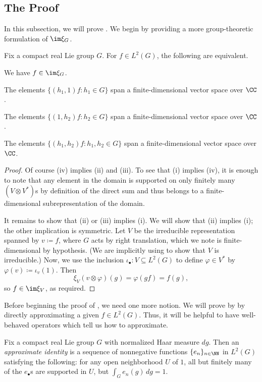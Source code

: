 \documentclass{amsart}
\begin{document}
\subsection{The Proof}
In this subsection, we will prove . We begin by providing a more group-theoretic formulation of $\im\xi_G$.
\begin{lemma} \label{lem:better-im-xi}
	Fix a compact real Lie group $G$. For $f\in L^2(G)$, the following are equivalent.
	\begin{listroman}
		\item We have $f\in\im\xi_G$.
		\item The elements $\{(h_1,1)f:h_1\in G\}$ span a finite-dimensional vector space over $\CC$.
		\item The elements $\{(1,h_2)f:h_2\in G\}$ span a finite-dimensional vector space over $\CC$.
		\item The elements $\{(h_1,h_2)f:h_1,h_2\in G\}$ span a finite-dimensional vector space over $\CC$.
	\end{listroman}
\end{lemma}
\begin{proof}
	Of course (iv) implies (ii) and (iii). To see that (i) implies (iv), it is enough to note that any element in the domain is supported on only finitely many $(V\otimes V^*)$s by definition of the direct sum and thus belongs to a finite-dimensional subrepresentation of the domain.

	It remains to show that (ii) or (iii) implies (i). We will show that (ii) implies (i); the other implication is symmetric. Let $V$ be the irreducible representation spanned by $v\coloneqq f$, where $G$ acts by right translation, which we note is finite-dimensional by hypothesis. (We are implicitly using  to show that $V$ is irreducible.) Now, we use the inclusion $\iota_\bullet\colon V\subseteq L^2(G)$ to define $\varphi\in V^*$ by $\varphi(v)\coloneqq\iota_v(1)$. Then
	\[\xi_V(v\otimes\varphi)(g)=\varphi(gf)=f(g),\]
	so $f\in\im\xi_V$, as required.
\end{proof}
Before beginning the proof of , we need one more notion. We will prove by  by directly approximating a given $f\in L^2(G)$. Thus, it will be helpful to have well-behaved operators which tell us how to approximate.
\begin{definition}
	Fix a compact real Lie group $G$ with normalized Haar measure $dg$. Then an \textit{approximate identity} is a sequence of nonnegative functions $\{e_n\}_{n\in\NN}$ in $L^2(G)$ satisfying the following: for any open neighborhood $U$ of $1$, all but finitely many of the $e_\bullet$s are supported in $U$, but $\int_Ge_n(g)\,dg=1$.
\end{definition}
\end{document}

